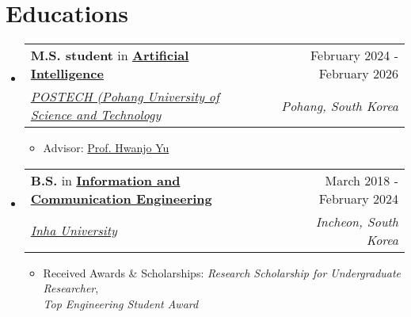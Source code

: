 \documentclass[letterpaper,11pt]{article}
\makeatletter
\newcommand{\resumeSubheading}[4]{
  \vspace{-1pt}\item
    \begin{tabular*}{0.97\textwidth}{l@{\extracolsep{\fill}}r}
      #1 & #2 \\
      \textit{\small#3} & \textit{\small #4} \\
    \end{tabular*}\vspace{-5pt}
}
\makeatother
\begin{document}
    \section{Educations}
    \begin{itemize}[leftmargin=*,label=]
        \resumeSubheading
        {\textbf{M.S. student} in \textbf{\href{https://ai.postech.ac.kr/}{Artificial Intelligence}\textbf{}}}{February 2024 - February 2026}{\href{https://www.postech.ac.kr/eng/}{POSTECH (Pohang University of Science and Technology}}{Pohang, South Korea}
            \begin{itemize}[label=\bullet]
                \item{Advisor: \href{https://sites.google.com/view/postechdi/member/faculty?authuser=0}{Prof. Hwanjo Yu}}
            \end{itemize}
            
        \resumeSubheading
        {\textbf{B.S.} in \textbf{\href{http://bit.ly/3Uu4LTi}{Information and Communication Engineering}}}{March 2018 - February 2024}{\href{https://eng.inha.ac.kr/eng/index.do}{Inha University}}{Incheon, South Korea}
            \begin{itemize}[label=\bullet]
                \item{Received Awards \& Scholarships: \textit{Research Scholarship for Undergraduate Researcher}, \\ \textit{Top Engineering Student Award}}
            \end{itemize}

    \end{itemize}

    
\end{document}
